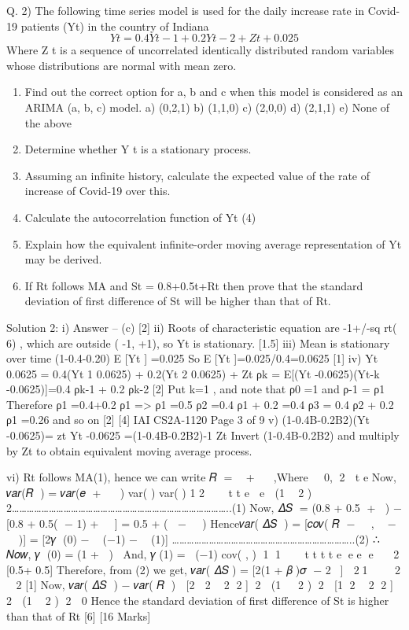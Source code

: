 \documentclass[a4paper,12pt]{article}
\begin{document}
Q. 2) The following time series model is used for the daily increase rate in Covid-19 patients
(Yt) in the country of Indiana
$$Y t = 0.4Yt-1 + 0.2Yt-2 + Z t + 0.025$$
Where {Z t} is a sequence of uncorrelated identically distributed random variables whose
distributions are normal with mean zero.

\begin{enumerate}
\item  Find out the correct option for a, b and c when this model is considered as an ARIMA
(a, b, c) model.
a) (0,2,1)
b) (1,1,0)
c) (2,0,0)
d) (2,1,1)
e) None of the above 
\item   Determine whether {Y t} is a stationary process. 
\item    Assuming an infinite history, calculate the expected value of the rate of increase of
Covid-19 over this. 
\item  Calculate the autocorrelation function of {Yt} (4)
\item  Explain how the equivalent infinite-order moving average representation of {Yt} may
be derived. 
\item   If Rt follows MA and St = 0.8+0.5t+Rt then prove that the standard deviation of
first difference of St will be higher than that of Rt. 
\end{enumerate}

Solution 2:
i) Answer – (c) [2]
ii) Roots of characteristic equation are -1+/-sq rt( 6) , which are outside ( -1, +1),
so {Yt} is stationary. [1.5]
iii)
Mean is stationary over time
(1-0.4-0.20) E [Yt ] =0.025
So E [Yt ]=0.025/0.4=0.0625 [1]
iv)
Yt 0.0625 = 0.4(Yt 1 0.0625) + 0.2(Yt 2 0.0625) + Zt
ρk = E[(Yt -0.0625)(Yt-k -0.0625)]=0.4 ρk-1 + 0.2 ρk-2
[2]
Put k=1 , and note that ρ0 =1 and ρ-1 = ρ1
Therefore
ρ1 =0.4+0.2 ρ1 => ρ1 =0.5
ρ2 =0.4 ρ1 + 0.2 =0.4
ρ3 = 0.4 ρ2 + 0.2 ρ1 =0.26
and so on [2]
[4]
IAI CS2A-1120
Page 3 of 9
v)
(1-0.4B-0.2B2)(Yt -0.0625)= zt
Yt -0.0625 =(1-0.4B-0.2B2)-1 Zt
Invert (1-0.4B-0.2B2) and multiply by Zt to obtain equivalent moving average process. 

vi)
Rt follows MA(1), hence we can write
𝑅􀯧 = 𝑒􀯧 + 𝛽𝑒􀯧􀬿􀬵,Where ~ 0, 2  t e 
Now, 𝑣𝑎𝑟(𝑅􀯧 ) = 𝑣𝑎𝑟(𝑒􀯧 + 𝛽𝑒􀯧􀬿􀬵)
var( ) var( ) 1
2
   t t e  e 
 (1  2 ) 2……………………………………………………………………………..(1) 
Now, 𝛥𝑆􀯧 = (0.8 + 0.5𝑡 + 𝑅􀯧) − [0.8 + 0.5(𝑡 − 1) + 𝑅􀯧􀬿􀬵]
= 0.5 + (𝑅􀯧 − 𝑅􀯧􀬿􀬵) 
Hence𝑣𝑎𝑟( 𝛥𝑆􀯧 ) = [𝑐𝑜𝑣( 𝑅􀯧 − 𝑅􀯧􀬿􀬵, 𝑅􀯧 − 𝑅􀯧􀬿􀬵)] 
= [2𝛾􀯋 (0) − 𝛾􀯋 (−1) − 𝛾􀯋 (1)] ………………………………………………………………..(2) 
∴ 𝑁𝑜𝑤, 𝛾􀯋 (0) = (1 + 𝛽􀬶)𝜎􀬶
And, 𝛾􀯋(1) = 𝛾􀯋(−1) cov( , ) 1 1    t t t t e e e e   2 [0.5+ 0.5]
Therefore, from (2) we get,
𝑣𝑎𝑟( 𝛥𝑆􀯧) = [2(1 + 𝛽􀬶)𝜎􀬶 − 2𝛽𝜎􀬶]  21    2  2 [1]
Now, 𝑣𝑎𝑟( 𝛥𝑆􀯧 ) − 𝑣𝑎𝑟( 𝑅􀯧 )
 [2  2  2 2 ] 2  (1   2 ) 2 
 [1 2  2 2 ] 2 
 (1  2 ) 2  0 
Hence the standard deviation of first difference of St is higher than that of Rt 
[6]
[16 Marks]
\end{document}
